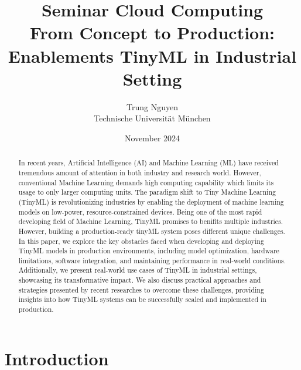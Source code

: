 \documentclass[twocolumn]{article}
\author{Trung Nguyen\\ Technische Universit\"at M\"unchen}
\title{Seminar Cloud Computing \\
       {\bf From Concept to Production: Enablements TinyML in Industrial Setting}
}
\date{November 2024}
\begin{document}
\maketitle

\begin{abstract}
In recent years, Artificial Intelligence (AI) and Machine Learning (ML) have received tremendous amount of attention in both industry and research world. However, conventional Machine Learning demands high computing capability which limits its usage to only larger computing units. The paradigm shift to Tiny Machine Learning (TinyML) is revolutionizing industries by enabling the deployment of machine learning models on low-power, resource-constrained devices. Being one of the most rapid developing field of Machine Learning, TinyML promises to benifits multiple industries. However, building a production-ready tinyML system poses different unique challenges. In this paper, we explore the key obstacles faced when developing and deploying TinyML models in production environments, including model optimization, hardware limitations, software integration, and maintaining performance in real-world conditions. Additionally, we present real-world use cases of TinyML in industrial settings, showcasing its transformative impact. We also discuss practical approaches and strategies presented by recent researches \cite{ren_tinyol_2021} to overcome these challenges, providing insights into how TinyML systems can be successfully scaled and implemented in production.
\end{abstract}

\section{Introduction}
\label{introduction}
\end{document}
